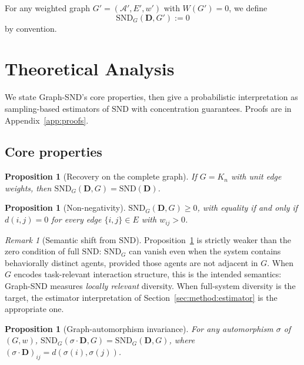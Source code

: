 \documentclass{article}
\theoremstyle{plain}
\newtheorem{proposition}[theorem]{Proposition}
\theoremstyle{definition}
\theoremstyle{remark}
\newtheorem{remark}[theorem]{Remark}
\newcommand{\Agents}{\mathcal{A}}        %
\newcommand{\SND}{\ensuremath{\mathrm{SND}}}
\newcommand{\SNDG}{\mathrm{SND}_{G}}
\begin{document}
For any weighted graph $G' = (\Agents', E', w')$ with $W(G') = 0$, we define
\[
\SNDG(\mathbf{D}, G') := 0
\]
by convention.

\section{Theoretical Analysis}
\label{sec:theory}

We state Graph-SND's core properties, then give a probabilistic
interpretation as sampling-based estimators of $\SND$ with concentration
guarantees. Proofs are in Appendix~\ref{app:proofs}.

\subsection{Core properties}

\begin{proposition}[Recovery on the complete graph]
\label{prop:recovery}
If $G = K_n$ with unit edge weights, then
$\SNDG(\mathbf{D}, G) = \SND(\mathbf{D})$.
\end{proposition}

\begin{proposition}[Non-negativity]
\label{prop:nonneg}
$\SNDG(\mathbf{D}, G) \geq 0$, with equality if and only if $d(i,j) = 0$
for every edge $\{i,j\} \in E$ with $w_{ij} > 0$.
\end{proposition}

\begin{remark}[Semantic shift from $\SND$]
\label{rem:semantics}
Proposition~\ref{prop:nonneg} is strictly weaker than the zero condition
of full $\SND$: $\SNDG$ can vanish even when the system contains
behaviorally distinct agents, provided those agents are not adjacent in
$G$. When $G$ encodes task-relevant interaction structure, this is the
intended semantics: Graph-SND measures \emph{locally relevant}
diversity. When full-system diversity is the target, the estimator
interpretation of Section~\ref{sec:method:estimator} is the appropriate
one.
\end{remark}

\begin{proposition}[Graph-automorphism invariance]
\label{prop:perm}
For any automorphism $\sigma$ of $(G, w)$,
$\SNDG(\sigma \cdot \mathbf{D}, G) = \SNDG(\mathbf{D}, G)$, where
$(\sigma \cdot \mathbf{D})_{ij} = d(\sigma(i), \sigma(j))$.
\end{proposition}
\end{document}
